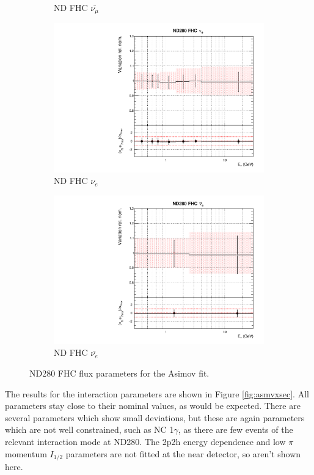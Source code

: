 \begin{figure}[!htbp]
\begin{subfigure}{0.49\textwidth}
  \caption{ND FHC $\bar{\nu_{\mu}}$}
\end{subfigure}
\begin{subfigure}{0.49\textwidth}
  \centering
  \includegraphics[width=0.99\linewidth]{figs/asmvfluxpoly2}
  \caption{ND FHC $\nu_e$}
\end{subfigure}
\begin{subfigure}{0.49\textwidth}
  \centering
  \includegraphics[width=0.99\linewidth]{figs/asmvfluxpoly3}
  \caption{ND FHC $\bar{\nu_{e}}$}
\end{subfigure}
\caption{ND280 FHC flux parameters for the Asimov fit.}
\label{fig:asmvfluxND}
\end{figure}

The results for the interaction parameters are shown in Figure \ref{fig:asmvxsec}. All parameters stay close to their nominal values, as would be expected. There are several parameters which show small deviations, but these are again parameters which are not well constrained, such as NC 1$\gamma$, as there are few events of the relevant interaction mode at ND280. The 2p2h energy dependence and low $\pi$ momentum $I_{1/2}$ parameters are not fitted at the near detector, so aren't shown here.

